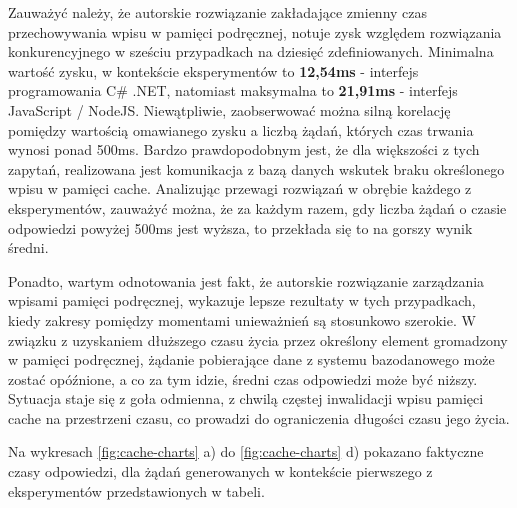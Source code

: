 Zauważyć należy, że autorskie rozwiązanie zakładające zmienny czas przechowywania wpisu w pamięci podręcznej, notuje zysk względem rozwiązania konkurencyjnego w sześciu przypadkach na dziesięć zdefiniowanych. Minimalna wartość zysku, w kontekście eksperymentów to \textbf{12,54ms} - interfejs programowania C\# .NET, natomiast maksymalna to \textbf{21,91ms} - interfejs JavaScript / NodeJS. Niewątpliwie, zaobserwować można silną korelację pomiędzy wartością omawianego zysku a liczbą żądań, których czas trwania wynosi ponad 500ms. Bardzo prawdopodobnym jest, że dla większości z tych zapytań, realizowana jest komunikacja z bazą danych wskutek braku określonego wpisu w pamięci cache. Analizując przewagi rozwiązań w obrębie każdego z eksperymentów, zauważyć można, że za każdym razem, gdy liczba żądań o czasie odpowiedzi powyżej 500ms jest wyższa, to przekłada się to na gorszy wynik średni.

Ponadto, wartym odnotowania jest fakt, że autorskie rozwiązanie zarządzania wpisami pamięci podręcznej, wykazuje lepsze rezultaty w tych przypadkach, kiedy zakresy pomiędzy momentami unieważnień są stosunkowo szerokie. W związku z uzyskaniem dłuższego czasu życia przez określony element gromadzony w pamięci podręcznej, żądanie pobierające dane z systemu bazodanowego może zostać opóźnione, a co za tym idzie, średni czas odpowiedzi może być niższy. Sytuacja staje się z goła odmienna, z chwilą częstej inwalidacji wpisu pamięci cache na przestrzeni czasu, co prowadzi do ograniczenia długości czasu jego życia.

Na wykresach \ref{fig:cache-charts} a) do \ref{fig:cache-charts} d) pokazano faktyczne czasy odpowiedzi, dla żądań generowanych w kontekście pierwszego z eksperymentów przedstawionych w tabeli.

